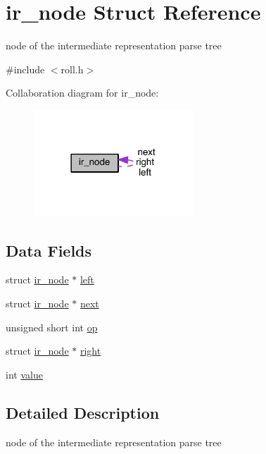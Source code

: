 \hypertarget{structir__node}{}\section{ir\+\_\+node Struct Reference}
\label{structir__node}


node of the intermediate representation parse tree  




{\ttfamily \#include $<$roll.\+h$>$}



Collaboration diagram for ir\+\_\+node\+:
\nopagebreak
\begin{figure}[H]
\begin{center}
\leavevmode
\includegraphics[width=170pt]{structir__node__coll__graph}
\end{center}
\end{figure}
\subsection*{Data Fields}
\begin{DoxyCompactItemize}
\item 
struct \hyperlink{structir__node}{ir\+\_\+node} $\ast$ \hyperlink{structir__node_ab6ecf53bf92c825b620435fc93a6b6ee}{left}
\item 
struct \hyperlink{structir__node}{ir\+\_\+node} $\ast$ \hyperlink{structir__node_ab1d37e8ddfafb50b2633b66af37fb064}{next}
\item 
unsigned short int \hyperlink{structir__node_a4d977601c157f732bd7655d7a47e8545}{op}
\item 
struct \hyperlink{structir__node}{ir\+\_\+node} $\ast$ \hyperlink{structir__node_ab72283b06a90004232c315bc52b0e9b5}{right}
\item 
int \hyperlink{structir__node_a4cd43e9ea9717dc8bda34aa8ca5f8d35}{value}
\end{DoxyCompactItemize}


\subsection{Detailed Description}
node of the intermediate representation parse tree 


